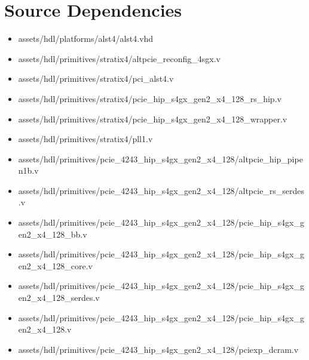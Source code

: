 \documentclass{article}
\begin{document}
\section*{Source Dependencies}
\begin{itemize}
	\item
assets/hdl/platforms/alst4/alst4.vhd
	\item
assets/hdl/primitives/stratix4/altpcie\_reconfig\_4sgx.v
	\item
assets/hdl/primitives/stratix4/pci\_alst4.v
	\item
assets/hdl/primitives/stratix4/pcie\_hip\_s4gx\_gen2\_x4\_128\_rs\_hip.v
	\item
assets/hdl/primitives/stratix4/pcie\_hip\_s4gx\_gen2\_x4\_128\_wrapper.v
	\item
assets/hdl/primitives/stratix4/pll1.v
	\item
assets/hdl/primitives/pcie\_4243\_hip\_s4gx\_gen2\_x4\_128/altpcie\_hip\_pipen1b.v
	\item
assets/hdl/primitives/pcie\_4243\_hip\_s4gx\_gen2\_x4\_128/altpcie\_rs\_serdes.v
	\item
assets/hdl/primitives/pcie\_4243\_hip\_s4gx\_gen2\_x4\_128/pcie\_hip\_s4gx\_gen2\_x4\_128\_bb.v
	\item
assets/hdl/primitives/pcie\_4243\_hip\_s4gx\_gen2\_x4\_128/pcie\_hip\_s4gx\_gen2\_x4\_128\_core.v
	\item
assets/hdl/primitives/pcie\_4243\_hip\_s4gx\_gen2\_x4\_128/pcie\_hip\_s4gx\_gen2\_x4\_128\_serdes.v
	\item
assets/hdl/primitives/pcie\_4243\_hip\_s4gx\_gen2\_x4\_128/pcie\_hip\_s4gx\_gen2\_x4\_128.v
	\item
assets/hdl/primitives/pcie\_4243\_hip\_s4gx\_gen2\_x4\_128/pciexp\_dcram.v
\end{itemize}
\end{document}
